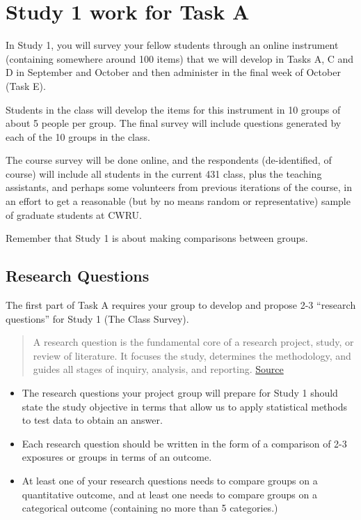 \documentclass[]{book}
\providecommand{\tightlist}{%
  \setlength{\itemsep}{0pt}\setlength{\parskip}{0pt}}
\theoremstyle{definition}
\theoremstyle{definition}
\theoremstyle{definition}
\theoremstyle{remark}
\begin{document}
\hypertarget{study-1-work-for-task-a}{%
\section{Study 1 work for Task A}\label{study-1-work-for-task-a}}

In Study 1, you will survey your fellow students through an online
instrument (containing somewhere around 100 items) that we will develop
in Tasks A, C and D in September and October and then administer in the
final week of October (Task E).

Students in the class will develop the items for this instrument in 10
groups of about 5 people per group. The final survey will include
questions generated by each of the 10 groups in the class.

The course survey will be done online, and the respondents
(de-identified, of course) will include all students in the current 431
class, plus the teaching assistants, and perhaps some volunteers from
previous iterations of the course, in an effort to get a reasonable (but
by no means random or representative) sample of graduate students at
CWRU.

Remember that Study 1 is about making comparisons between groups.

\hypertarget{research-questions}{%
\subsection{Research Questions}\label{research-questions}}

The first part of Task A requires your group to develop and propose 2-3
``research questions'' for Study 1 (The Class Survey).

\begin{quote}
A research question is the fundamental core of a research project,
study, or review of literature. It focuses the study, determines the
methodology, and guides all stages of inquiry, analysis, and reporting.
\href{https://researchrundowns.com/intro/writing-research-questions/}{Source}
\end{quote}

\begin{itemize}
\tightlist
\item
  The research questions your project group will prepare for Study 1
  should state the study objective in terms that allow us to apply
  statistical methods to test data to obtain an answer.
\item
  Each research question should be written in the form of a comparison
  of 2-3 exposures or groups in terms of an outcome.
\item
  At least one of your research questions needs to compare groups on a
  quantitative outcome, and at least one needs to compare groups on a
  categorical outcome (containing no more than 5 categories.)
\end{itemize}
\end{document}
